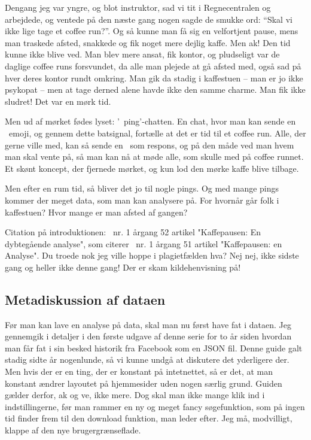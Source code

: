 \begin{article}
Dengang jeg var yngre, og blot instruktor, sad vi tit i Regnecentralen og arbejdede, og ventede på den næste gang nogen sagde de smukke ord: ``Skal vi ikke lige tage et coffee run?''. Og så kunne man få sig en velfortjent pause, mens man traskede afsted, snakkede og fik noget mere dejlig kaffe. Men ak! Den tid kunne ikke blive ved. Man blev mere ansat, fik kontor, og pludseligt var de daglige coffee runs forsvundet, da alle man plejede at gå afsted med, også sad på hver deres kontor rundt omkring. Man gik da stadig i kaffestuen -- man er jo ikke psykopat -- men at tage derned alene havde ikke den samme charme. Man fik ikke sludret! Det var en mørk tid.

Men ud af mørket fødes lyset: '\coffee\ ping'-chatten.
En chat, hvor man kan sende en \coffee\ emoji, og gennem dette batsignal, fortælle at det er tid til et coffee run. Alle, der gerne ville med, kan så sende en \coffee\ som respons, og på den måde ved man hvem man skal vente på, så man kan nå at møde alle, som skulle med på coffee runnet. Et skønt koncept, der fjernede mørket, og kun lod den mørke kaffe blive tilbage.

Men efter en rum tid, så bliver det jo til nogle pings. Og med mange pings kommer der meget data, som man kan analysere på. For hvornår går folk i kaffestuen? Hvor mange er man afsted af gangen?

Citation på introduktionen: \madsfoek\ nr. 1 årgang 52 artikel "Kaffepausen: En dybtegående analyse", som citerer \madsfoek\ nr. 1 årgang 51 artikel "Kaffepausen: en Analyse".
Du troede nok jeg ville hoppe i plagietfælden hva? Nej nej, ikke sidste gang og heller ikke denne gang! Der er skam kildehenvisning på!


\subsection*{Metadiskussion af dataen}

Før man kan lave en analyse på data, skal man nu først have fat i dataen.
Jeg gennemgik i detaljer i den første udgave af denne serie for to år siden hvordan man får fat i sin besked historik fra Facebook som en JSON fil. Denne guide galt stadig sidte år nogenlunde, så vi kunne undgå at diskutere det yderligere der. Men hvis der er en ting, der er konstant på intetnettet, så er det, at man konstant ændrer layoutet på hjemmesider uden nogen særlig grund. Guiden gælder derfor, ak og ve, ikke mere. Dog skal man ikke mange klik ind i indstillingerne, før man rammer en ny og meget fancy søgefunktion, som på ingen tid finder frem til den download funktion, man leder efter. Jeg må, modvilligt, klappe af den nye brugergrænseflade.


\end{article}
